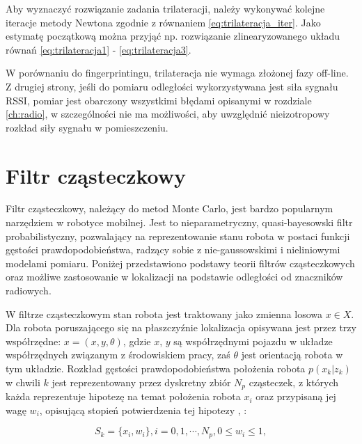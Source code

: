 Aby wyznaczyć rozwiązanie zadania trilateracji, należy wykonywać kolejne iteracje metody Newtona zgodnie z równaniem \ref{eq:trilateracja_iter}. Jako estymatę początkową można przyjąć np. rozwiązanie zlinearyzowanego układu równań \ref{eq:trilateracja1} - \ref{eq:trilateracja3}.

W porównaniu do fingerprintingu, trilateracja nie wymaga złożonej fazy off-line. Z drugiej strony, jeśli do pomiaru odległości wykorzystywana jest siła sygnału RSSI, pomiar jest obarczony wszystkimi błędami opisanymi w rozdziale \ref{ch:radio}, w szczególności nie ma możliwości, aby uwzględnić nieizotropowy rozkład siły sygnału w pomieszczeniu. 

\section{Filtr cząsteczkowy}
\label{sec:filtr-czasteczkowy}
Filtr cząsteczkowy, należący do metod Monte Carlo, jest bardzo popularnym narzędziem w robotyce mobilnej. Jest to nieparametryczny, quasi-bayesowski filtr probabilistyczny, pozwalający na reprezentowanie stanu robota w postaci funkcji gęstości prawdopodobieństwa, radzący sobie z nie-gaussowskimi i nieliniowymi modelami pomiaru. Poniżej przedstawiono podstawy teorii filtrów cząsteczkowych oraz możliwe zastosowanie w lokalizacji na podstawie odległości od znaczników radiowych. 

W filtrze cząsteczkowym stan robota jest traktowany jako zmienna losowa $x \in X$. Dla robota poruszającego się na płaszczyźnie lokalizacja opisywana jest przez trzy współrzędne:  $ x = (x, y, \theta)$, gdzie $x$, $y$ są współrzędnymi pojazdu w układze współrzędnych związanym z środowiskiem pracy, zaś $\theta$ jest orientacją robota w tym układzie. Rozkład gęstości prawdopodobieństwa położenia robota $p(x_k | z_k)$ w chwili $k$  jest reprezentowany przez dyskretny zbiór $N_p$ cząsteczek, z których każda reprezentuje hipotezę na temat położenia robota $x_i$ oraz przypisaną jej wagę $w_i$, opisującą stopień potwierdzenia tej hipotezy \cite{preskrypt}, \cite{probabilistic_robotics}:

\begin{equation}
 \label{eq:pf_sk}
 S_{k} = \{ x_i, w_i \}, i = 0, 1, \cdots, N_p, 0 \leq w_i \leq 1,
\end{equation}

